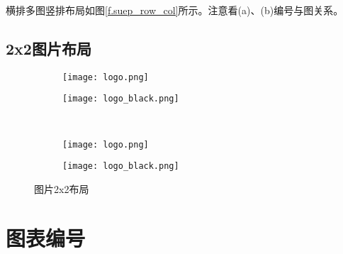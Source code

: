 横排多图竖排布局如图\ref{f.suep_row_col}所示。注意看(a)、(b)编号与图关系。

\subsection{2x2图片布局}

\begin{figure}[!htb]
    \centering
    \begin{subfigure}[t]{0.3\linewidth}
        \captionsetup{justification=centering}
        \begin{minipage}[b]{1\linewidth}
            \centering
            \texttt{[image: logo.png]}
            \caption{}
        \end{minipage}
    \end{subfigure}
    \hspace{-5em}
    \begin{subfigure}[t]{0.3\linewidth}
        \captionsetup{justification=centering}
        \begin{minipage}[b]{1\linewidth}
            \centering
            \texttt{[image: logo\_black.png]}
            \caption{}
        \end{minipage}
    \end{subfigure}\\
    \begin{subfigure}[t]{0.3\linewidth}
        \captionsetup{justification=centering}
        \begin{minipage}[b]{1\linewidth}
            \centering
            \texttt{[image: logo.png]}
            \caption{}
        \end{minipage}
    \end{subfigure}
    \hspace{-5em}
    \begin{subfigure}[t]{0.3\linewidth}
        \captionsetup{justification=centering}
        \begin{minipage}[b]{1\linewidth}
            \centering
            \texttt{[image: logo\_black.png]}
            \caption{}
        \end{minipage}
    \end{subfigure}
    \caption{图片2x2布局}
    \label{f.csu_2x2}
\end{figure}

\newpage

\section{图表编号}


